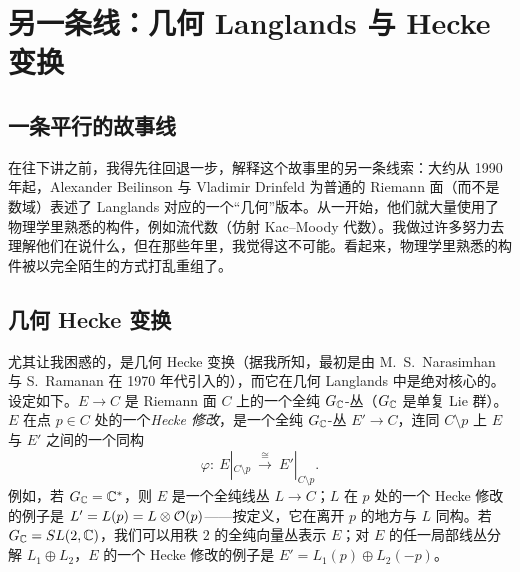 \section{另一条线：几何 Langlands 与 Hecke 变换}

\par\medskip

\subsection{一条平行的故事线}

在往下讲之前，我得先往回退一步，解释这个故事里的另一条线索：大约从 1990 年起，Alexander Beilinson 与 Vladimir Drinfeld 为普通的 Riemann 面（而不是数域）表述了 Langlands 对应的一个“几何”版本。从一开始，他们就大量使用了物理学里熟悉的构件，例如流代数（仿射 Kac--Moody 代数）。我做过许多努力去理解他们在说什么，但在那些年里，我觉得这不可能。看起来，物理学里熟悉的构件被以完全陌生的方式打乱重组了。

\subsection{几何 Hecke 变换}

尤其让我困惑的，是几何 Hecke 变换（据我所知，最初是由 M.~S.~Narasimhan 与 S.~Ramanan 在 1970 年代引入的），而它在几何 Langlands 中是绝对核心的。设定如下。$E\to C$ 是 Riemann 面 $C$ 上的一个全纯 $G_{\mathbb{C}}$-丛（$G_{\mathbb{C}}$ 是单复 Lie 群）。$E$ 在点 $p\in C$ 处的一个\emph{Hecke 修改}，是一个全纯 $G_{\mathbb{C}}$-丛 $E'\to C$，连同 $C\setminus p$ 上 $E$ 与 $E'$ 之间的一个同构
\[
  \varphi:\ E|_{C\setminus p}\ \xrightarrow{\ \cong\ }\ E'|_{C\setminus p}.
\]
例如，若 $G_{\mathbb{C}}=\mathbb{C}^*$，则 $E$ 是一个全纯线丛 $L\to C$；$L$ 在 $p$ 处的一个 Hecke 修改的例子是 $L'=L(p)=L\otimes\mathcal{O}(p)$——按定义，它在离开 $p$ 的地方与 $L$ 同构。若 $G_{\mathbb{C}}=SL(2,\mathbb{C})$，我们可以用秩 $2$ 的全纯向量丛表示 $E$；对 $E$ 的任一局部线丛分解 $L_1\oplus L_2$，$E$ 的一个 Hecke 修改的例子是 $E'=L_1(p)\oplus L_2(-p)$。

